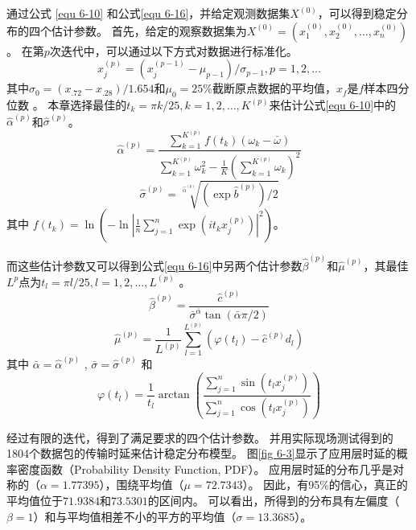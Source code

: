 通过公式 \ref{equ 6-10} 和公式\ref{equ 6-16}，并给定观测数据集$X^{(0)}$，可以得到稳定分布的四个估计参数。
首先，给定的观察数据集为$X^{(0)}=(x_1^{(0)}, x_2^{(0)}, \ldots, x_n^{(0)})$。
在第$p$次迭代中，可以通过以下方式对数据进行标准化。
\begin{equation}
x_{j}^{(p)}=\left(x_{j}^{(p-1)}-\mu_{p-1}\right) / \sigma_{p-1}, p = 1,2,\ldots
\end{equation}
其中${\sigma_{0}=\left(x_{.72}-x_{.28}\right) / 1.654}$和$\mu_{0}=25 \%$截断原点数据的平均值，$x_{f}$是$f$样本四分位数 \cite{fama1971parameter}。
本章选择最佳的$t_{k}=\pi k / 25, k=1,2,\ldots,K^{(p)}$\cite{koutrouvelis1980regression}来估计公式\ref{equ 6-10}中的$\hat{\alpha}^{(p)}$和$\hat{\sigma}^{(p)}$。
\begin{equation}
	{\hat{\alpha}^{(p)}=\frac{ \sum_{k=1}^{K^{(p)}} f\left(t_{k}\right)\left(\omega_{k}-\bar{\omega}\right)}{\sum_{k=1}^{K^{(p)}} \omega_{k}^{2}-\frac{1}{K}\left(\sum_{k=1}^{K^{(p)}} \omega_{k}\right)^{2}} } 
\end{equation}
\begin{equation}
	{\hat{\sigma}^{(p)}=\sqrt[\hat{\alpha}^{(p)}]{ (\exp \hat{b}^{(p)}) / 2}}
\end{equation}
其中 $f\left(t_{k}\right) = \ln \left(-\ln \left|\frac{1}{n} \sum_{j=1}^{n} \exp \left(i t_{k} x_{j}^{(p)}\right)\right|^{2}\right)$。

而这些估计参数又可以得到公式\ref{equ 6-16}中另两个估计参数$\hat{\beta}^{(p)}$和$\hat{\mu}^{(p)}$，其最佳$L^{p}$点为$t_{l}=\pi l / 25, l=1,2,\ldots,L^{(p)}$ \cite{koutrouvelis1980regression}。
\begin{equation}
\hat{\beta}^{(p)}= \frac{\hat{c}^{(p)}}{\bar{\sigma}^{\bar{\alpha}} \tan (\bar{\alpha} \pi / 2)}
\end{equation}
\begin{equation}
\hat{\mu}^{(p)}= \frac{1}{L^{(p)}} \sum_{l=1}^{L^{(p)}}\left(\varphi\left(t_{l}\right)-\hat{c}^{(p)} d_{l}\right)
\end{equation}
其中 $\bar{\alpha} =  {\hat{\alpha}^{(p)}}$ , $\bar{\sigma} =  {\hat{\sigma}^{(p)}}$ 和 
\begin{equation}
\varphi\left(t_{l}\right) = \frac{1}{t_{l}} \arctan \left(\frac{ \sum_{j=1}^{n} \sin \left(t_l x_{j}^{(p)}\right)}{\sum_{j=1}^{n} \cos \left(t_l x_{j}^{(p)}\right)}\right)
\end{equation}

经过有限的迭代，得到了满足要求的四个估计参数。
并用实际现场测试得到的1804个数据包的传输时延来估计稳定分布模型。
图\ref{fig 6-3}显示了应用层时延的概率密度函数（Probability Density Function, PDF）。
应用层时延的分布几乎是对称的（$\alpha = 1.77395$），围绕平均值（$\mu = 72.7343$）。
因此，有95\%的信心，真正的平均值位于$71.9384$和$73.5301$的区间内。
可以看出，所得到的分布具有左偏度（$\beta = 1$）和与平均值相差不小的平方的平均值（$\sigma = 13.3685$）。

